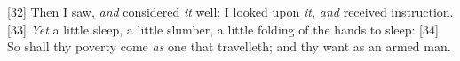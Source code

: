 [32] \textcolor[cmyk]{0.99998,1,0,0}{Then I saw, \emph{and} considered \emph{it} well: I looked upon \emph{it,} \emph{and} received instruction.}
[33] \textcolor[cmyk]{0.99998,1,0,0}{\emph{Yet} a little sleep, a little slumber, a little folding of the hands to sleep:}
[34] \textcolor[cmyk]{0.99998,1,0,0}{So shall thy poverty come \emph{as} one that travelleth; and thy want as an armed man.}




